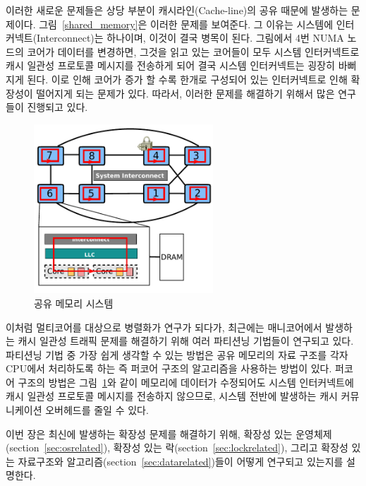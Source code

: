 이러한 새로운 문제들은 상당 부분이 캐시라인(Cache-line)의 공유 때문에 발생하는 문제이다.
그림~\ref{shared_memory}은 이러한 문제를 보여준다. 
그 이유는 시스템에 인터커넥트(Interconnect)는 하나이며, 이것이 결국 병목이 된다. 
그림에서 4번 NUMA 노드의 코어가 데이터를 변경하면, 그것을 읽고 있는 코어들이 
모두 시스템 인터커넥트로 캐시 일관성 프로토콜 메시지를 전송하게 되어 결국 시스템 인터커넥트는 
굉장히 바뻐지게 된다. 
이로 인해 코어가 증가 할 수록 한개로 구성되어 있는 인터커넥트로 인해 확장성이 떨어지게 되는 문제가 있다. 
따라서, 이러한 문제를 해결하기 위해서 많은 연구들이 진행되고 있다. 

\begin{figure}[h!]
    \centering
    \includegraphics[width=0.6\textwidth]{fig/archcache_percore}
    \caption{공유 메모리 시스템}
  \label{shared_memory2}
\end{figure}

이처럼 멀티코어를 대상으로 병렬화가 연구가 되다가, 최근에는 매니코어에서 발생하는 
캐시 일관성 트래픽 문제를 해결하기 위해 여러 파티션닝 기법들이 연구되고 있다.  
파티션닝 기법 중 가장 쉽게 생각할 수 있는 방법은 공유 메모리의 자료 구조를 각자 
CPU에서 처리하도록 하는 즉 퍼코어 구조의 알고리즘을 사용하는 방법이 있다.
퍼코어 구조의 방법은 그림~\ref{shared_memory2}와 같이 메모리에 데이터가 수정되어도 시스템 
인터커넥트에 캐시 일관성 프로토콜 메시지를 전송하지 않으므로, 
시스템 전반에 발생하는 캐시 커뮤니케이션 오버헤드를 줄일 수 있다. 

이번 장은 최신에 발생하는 확장성 문제를 해결하기 위해, 확장성 있는
운영체제(section~\ref{sec:osrelated}), 확장성 있는 락(section~\ref{sec:lockrelated}), 
그리고 확장성 있는 자료구조와 알고리즘(section~\ref{sec:datarelated})들이 어떻게 연구되고 
있는지를 설명한다.




%



